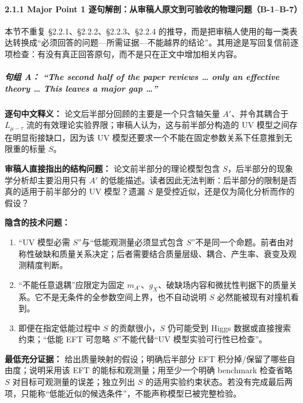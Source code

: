 \documentclass[
]{article}
\providecommand{\tightlist}{%
  \setlength{\itemsep}{0pt}\setlength{\parskip}{0pt}}
\begin{document}
\paragraph{2.1.1 Major Point 1
逐句解剖：从审稿人原文到可验收的物理问题（B-1--B-7）}\label{major-point-1-ux9010ux53e5ux89e3ux5256ux4eceux5ba1ux7a3fux4ebaux539fux6587ux5230ux53efux9a8cux6536ux7684ux7269ux7406ux95eeux9898b-1b-7}

本节不重复 §2.2.1、§2.2.2、§2.2.3、§2.2.4
的推导，而是把审稿人使用的每一类表达转换成``必须回答的问题---所需证据---不能越界的结论''。其用途是写回复信前逐项检查：有没有真正回答原句，而不是只在正文中增加相关内容。

\subparagraph{\texorpdfstring{句组 A： ``The second half of the paper
reviews \ldots{} only an effective theory \ldots{} This leaves a major
gap
\ldots{}''}{句组 A： ``The second half of the paper reviews \ldots{} only an effective theory \ldots{} This leaves a major gap \ldots''}}\label{ux53e5ux7ec4-a-the-second-half-of-the-paper-reviews-only-an-effective-theory-this-leaves-a-major-gap}

\textbf{逐句中文释义：} 论文后半部分回顾的主要是一个只含轴矢量
\(A'\)、并令其耦合于 \(L_{\mu-\tau}\)
流的有效理论实验界限；审稿人认为，这与前半部分构造的 UV
模型之间存在明显衔接缺口，因为该 UV
模型还要求一个不能在固定参数关系下任意推到无限重的标量 \(S\)。

\textbf{审稿人直接指出的结构问题：} 论文前半部分的理论模型包含
\(S\)，后半部分的现象学分析却主要沿用只有 \(A'\)
的低能描述。读者因此无法判断：后半部分的限制是否真的适用于前半部分的 UV
模型？遗漏 \(S\) 是受控近似，还是仅为简化分析而作的假设？

\textbf{隐含的技术问题：}

\begin{enumerate}
\def\labelenumi{\arabic{enumi}.}
\tightlist
\item
  ``UV 模型必需 \(S\)''与``低能观测量必须显式包含
  \(S\)''不是同一个命题。前者由对称性破缺和质量关系决定；后者需要结合质量层级、耦合、产生率、衰变及观测精度判断。
\item
  ``不能任意退耦''应限定为固定
  \(m_{A'}\)、\(g_X\)、破缺场内容和微扰性判据下的质量关系。它不是无条件的全参数空间上界，也不自动说明
  \(S\) 必然能被现有对撞机看到。
\item
  即便在指定低能过程中 \(S\) 的贡献很小，\(S\) 仍可能受到 Higgs
  数据或直接搜索约束；``低能 EFT 可忽略 \(S\)''不能代替``UV
  模型实验可行性已检查''。
\end{enumerate}

\textbf{最低充分证据：} 给出质量映射的假设；明确后半部分 EFT
积分掉/保留了哪些自由度；说明采用该 EFT 的能标和观测量；用至少一个明确
benchmark 检查省略 \(S\) 对目标可观测量的误差；独立列出 \(S\)
的适用实验约束状态。若没有完成最后两项，只能称``低能近似的候选条件''，不能声称模型已被完整检验。
\end{document}
